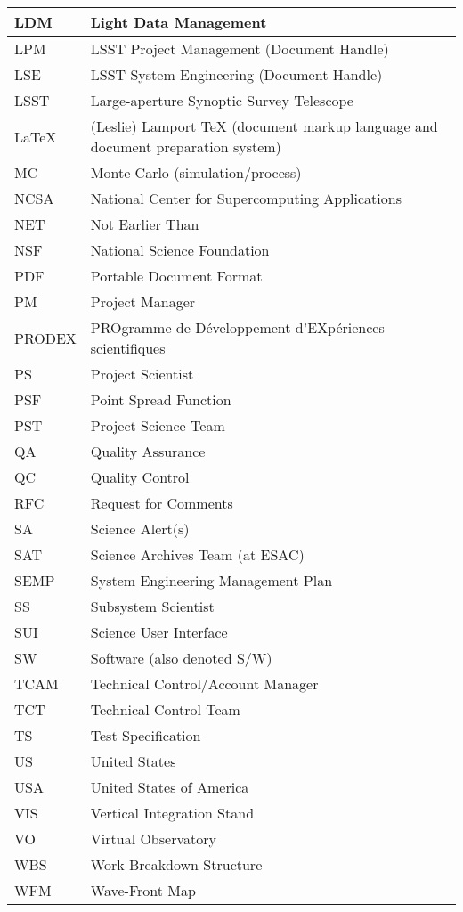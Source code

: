 \begin{longtable}{|l|p{}|}
LDM&Light Data Management \\\hline
LPM&LSST Project Management (Document Handle) \\\hline
LSE&LSST System Engineering (Document Handle) \\\hline
LSST&Large-aperture Synoptic Survey Telescope \\\hline
LaTeX&(Leslie) Lamport TeX (document markup language and document preparation system) \\\hline
MC&Monte-Carlo (simulation/process) \\\hline
NCSA&National Center for Supercomputing Applications \\\hline
NET&Not Earlier Than \\\hline
NSF&National Science Foundation \\\hline
PDF&Portable Document Format \\\hline
PM&Project Manager \\\hline
PRODEX&PROgramme de D\'eveloppement d'EXp\'eriences scientifiques \\\hline
PS&Project Scientist \\\hline
PSF&Point Spread Function \\\hline
PST&Project Science Team \\\hline
QA&Quality Assurance \\\hline
QC&Quality Control \\\hline
RFC&Request for Comments \\\hline
SA&Science Alert(s) \\\hline
SAT&Science Archives Team (at ESAC) \\\hline
SEMP&System Engineering Management Plan \\\hline
SS&Subsystem Scientist \\\hline
SUI&Science User Interface \\\hline
SW&Software (also denoted S/W) \\\hline
TCAM&Technical Control/Account Manager \\\hline
TCT&Technical Control Team \\\hline
TS&Test Specification \\\hline
US&United States \\\hline
USA&United States of America \\\hline
VIS&Vertical Integration Stand \\\hline
VO&Virtual Observatory \\\hline
WBS&Work Breakdown Structure \\\hline
WFM&Wave-Front Map \\\hline
\end{longtable} 
